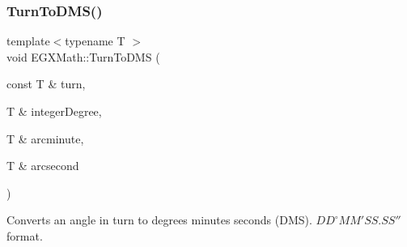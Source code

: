 \subsubsection{\texorpdfstring{Turn\+To\+D\+M\+S()}{TurnToDMS()}}
{\footnotesize\ttfamily template$<$typename T $>$ \\
void E\+G\+X\+Math\+::\+Turn\+To\+D\+MS (\begin{DoxyParamCaption}\item[{const T \&}]{turn,  }\item[{T \&}]{integer\+Degree,  }\item[{T \&}]{arcminute,  }\item[{T \&}]{arcsecond }\end{DoxyParamCaption})}



Converts an angle in turn to degrees minutes seconds (D\+MS). ${DD}^{\circ}{MM}'{SS.SS}''$ format. 


